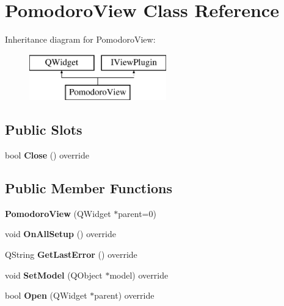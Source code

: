 \hypertarget{class_pomodoro_view}{}\section{Pomodoro\+View Class Reference}
\label{class_pomodoro_view}
Inheritance diagram for Pomodoro\+View\+:\begin{figure}[H]
\begin{center}
\leavevmode
\includegraphics[height=2.000000cm]{class_pomodoro_view}
\end{center}
\end{figure}
\subsection*{Public Slots}
\begin{DoxyCompactItemize}
\item 
\mbox{\label{class_pomodoro_view_a250f01540e299dc3777c0e118075461a}} 
bool {\bfseries Close} () override
\end{DoxyCompactItemize}
\subsection*{Public Member Functions}
\begin{DoxyCompactItemize}
\item 
\mbox{\label{class_pomodoro_view_a73074fd29303bf2e933f6e4fcba3e05a}} 
{\bfseries Pomodoro\+View} (Q\+Widget $\ast$parent=0)
\item 
\mbox{\label{class_pomodoro_view_af08465f4631ec877442d5fcde56d2f99}} 
void {\bfseries On\+All\+Setup} () override
\item 
\mbox{\label{class_pomodoro_view_ac18c3f31681087212f58d0c83f9efaa0}} 
Q\+String {\bfseries Get\+Last\+Error} () override
\item 
\mbox{\label{class_pomodoro_view_a77a5481dfcd4a784c9a20f9429641bbf}} 
void {\bfseries Set\+Model} (Q\+Object $\ast$model) override
\item 
\mbox{\label{class_pomodoro_view_a645600605cbd2577e452a46749c7553f}} 
bool {\bfseries Open} (Q\+Widget $\ast$parent) override
\end{DoxyCompactItemize}


